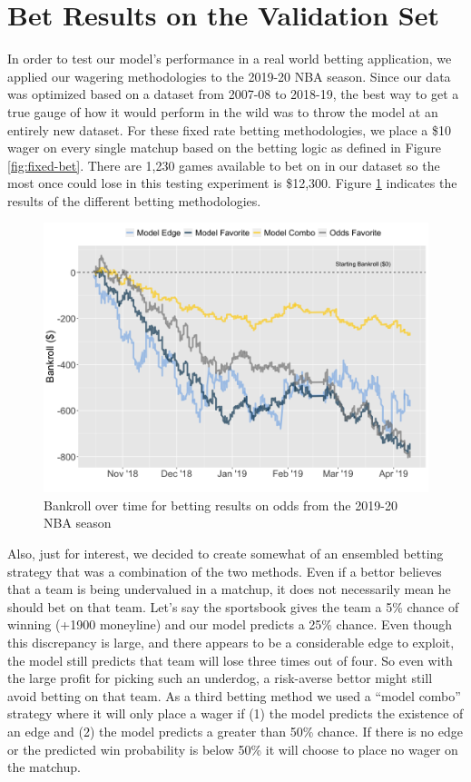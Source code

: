 \documentclass [MS] {uclathes}
\begin{document}
\section{Bet Results on the Validation Set}
In order to test our model's performance in a real world betting application, we applied our wagering methodologies to the 2019-20 NBA season. Since our data was optimized based on a dataset from 2007-08 to 2018-19, the best way to get a true gauge of how it would perform in the wild  was to throw the model at an entirely new dataset. For these fixed rate betting methodologies, we place a \$10 wager on every single matchup based on the betting logic as defined in Figure \ref{fig:fixed-bet}. There are 1,230 games available to bet on in our dataset so the most once could lose in this testing experiment is \$12,300. Figure \ref{fig:bet-perf-fixed} indicates the results of the different betting methodologies. 

\begin{figure}[h]
\centering
  \includegraphics[width=450px]{bet-performance-fixed.png}
  \caption{Bankroll over time for betting results on odds from the 2019-20 NBA season}
  \label{fig:bet-perf-fixed}
\end{figure}

Also, just for interest, we decided to create somewhat of an ensembled betting strategy that was a combination of the two methods. Even if a bettor believes that a team is being undervalued in a matchup, it does not necessarily mean he should bet on that team. Let's say the sportsbook gives the team a 5\% chance of winning (+1900 moneyline) and our model predicts a 25\% chance. Even though this discrepancy is large, and there appears to be a considerable edge to exploit, the model still predicts that team will lose three times out of four. So even with the large profit for picking such an underdog, a risk-averse bettor might still avoid betting on that team. As a third betting method we used a ``model combo'' strategy where it will only place a wager if (1) the model predicts the existence of an edge and (2) the model predicts a greater than 50\% chance. If there is no edge or the predicted win probability is below 50\% it will choose to place no wager on the matchup.
\end{document}
